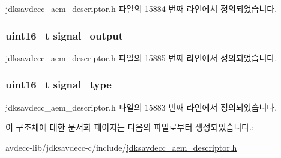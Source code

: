 jdksavdecc\+\_\+aem\+\_\+descriptor.\+h 파일의 15884 번째 라인에서 정의되었습니다.

\subsubsection[{\texorpdfstring{signal\+\_\+output}{signal_output}}]{\setlength{\rightskip}{0pt plus 5cm}uint16\+\_\+t signal\+\_\+output}\hypertarget{structjdksavdecc__descriptor__audio__cluster_ab4b91864e6fc335d7e86536d9f4461e4}{}\label{structjdksavdecc__descriptor__audio__cluster_ab4b91864e6fc335d7e86536d9f4461e4}


jdksavdecc\+\_\+aem\+\_\+descriptor.\+h 파일의 15885 번째 라인에서 정의되었습니다.

\subsubsection[{\texorpdfstring{signal\+\_\+type}{signal_type}}]{\setlength{\rightskip}{0pt plus 5cm}uint16\+\_\+t signal\+\_\+type}\hypertarget{structjdksavdecc__descriptor__audio__cluster_a248e60ef99d5ed1779989d1dd6b6dc5a}{}\label{structjdksavdecc__descriptor__audio__cluster_a248e60ef99d5ed1779989d1dd6b6dc5a}


jdksavdecc\+\_\+aem\+\_\+descriptor.\+h 파일의 15883 번째 라인에서 정의되었습니다.



이 구조체에 대한 문서화 페이지는 다음의 파일로부터 생성되었습니다.\+:\begin{DoxyCompactItemize}
\item 
avdecc-\/lib/jdksavdecc-\/c/include/\hyperlink{jdksavdecc__aem__descriptor_8h}{jdksavdecc\+\_\+aem\+\_\+descriptor.\+h}\end{DoxyCompactItemize}
